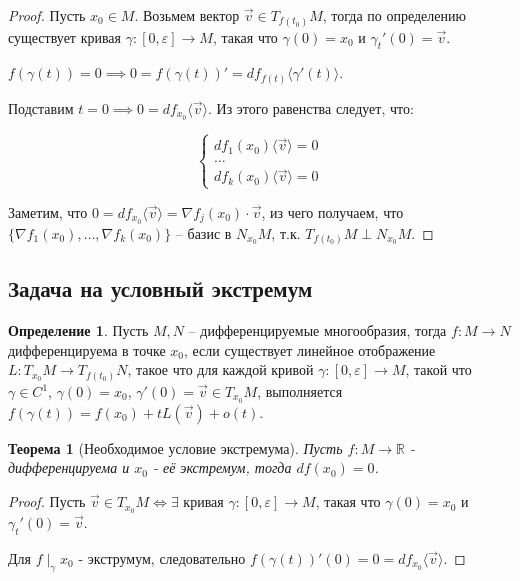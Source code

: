 \documentclass[a5paper]{article}
\newcounter{through}
\theoremstyle{plain}
\newtheorem{theorem}[through]{Теорема}
\theoremstyle{definition}
\newtheorem{definition}[through]{Определение}
\numberwithin{through}{section}
\numberwithin{equation}{section}
\begin{document}
\begin{proof}
	Пусть $x_0 \in M$. Возьмем вектор $\vec{v} \in T_{f(t_0)}M$, тогда по определению существует кривая $\gamma : [0, \varepsilon] \to M$, такая что $\gamma(0) = x_0$ и $\gamma_t'(0) = \vec{v}$.
	
	$f(\gamma(t)) = 0 \implies 0=f(\gamma(t))'=df_{f(t)}\langle\gamma'(t)\rangle$.
	
	Подставим $t=0 \implies 0 = df_{x_0}\langle\vec{v}\rangle$. Из этого равенства следует, что: 
	
	\begin{equation*}
	\begin{cases}
	df_1(x_0)\langle\vec{v}\rangle = 0
	\\
	\ldots
	\\
	df_k(x_0)\langle\vec{v}\rangle = 0
	\end{cases}
	\end{equation*}
	
	Заметим, что $0 = df_{x_0}\langle\vec{v}\rangle = \nabla f_j(x_0) \cdot \vec{v}$, из чего получаем, что 
	\\
	$\{\nabla f_1(x_0), \ldots, \nabla f_k(x_0)\}$ -- базис в $N_{x_0}M$, т.к. $T_{f(t_0)}M \perp N_{x_0}M$.
\end{proof}

\subsection{Задача на условный экстремум}

\begin{definition}
	Пусть $M, N$ -- дифференцируемые многообразия, тогда $f : M \to N$ дифференцируема в точке $x_0$, если существует линейное отображение $L : T_{x_0}M \to T_{f(t_0)}N$, такое что для каждой кривой $\gamma : [0, \varepsilon] \to M$, такой что $\gamma \in C^1$, $\gamma(0)=x_0$, $\gamma'(0)=\vec{v} \in T_{x_0}M$, выполняется $f(\gamma(t)) = f(x_0) + tL(\vec{v}) + o(t)$.
\end{definition}

\begin{theorem}[Необходимое условие экстремума]
	Пусть $f: M \to \mathbb{R}$ - дифференцируема и $x_0$ - её экстремум, тогда $df(x_0) = 0$.
\end{theorem}

\begin{proof}
	Пусть $\vec{v} \in T_{x_0}M \Longleftrightarrow \exists $ кривая $\gamma : [0, \varepsilon] \to M$, такая что $\gamma(0) = x_0$ и $\gamma_t'(0) = \vec{v}$.
	
	Для $f \mid_{\gamma} x_0$ - экструмум, следовательно $f(\gamma(t))'(0)=0=df_{x_0}\langle\vec{v}\rangle$.
\end{proof}
\end{document}
